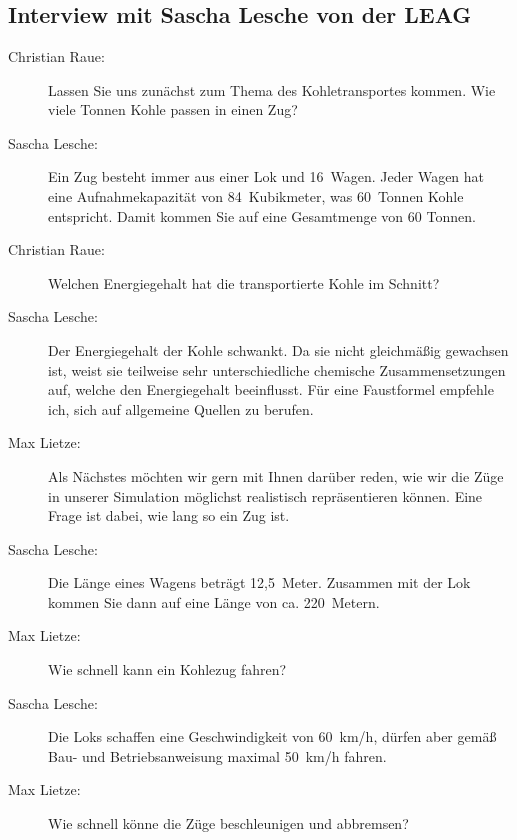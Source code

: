 \chapter{\appendixname}

\section*{Interview mit Sascha Lesche von der LEAG}

\begin{description}

    \item[Christian Raue:] Lassen Sie uns zunächst zum Thema des Kohletransportes kommen. Wie viele Tonnen Kohle passen in einen Zug?

    \item[Sascha Lesche:] Ein Zug besteht immer aus einer Lok und 16~Wagen. Jeder Wagen hat eine Aufnahmekapazität von 84~Kubikmeter, was 60~Tonnen Kohle entspricht. Damit kommen Sie auf eine Gesamtmenge von 60 Tonnen.

    \item[Christian Raue:] Welchen Energiegehalt hat die transportierte Kohle im Schnitt?

    \item[Sascha Lesche:] Der Energiegehalt der Kohle schwankt. Da sie nicht gleichmäßig gewachsen ist, weist sie teilweise sehr unterschiedliche chemische Zusammensetzungen auf, welche den Energiegehalt beeinflusst. Für eine Faustformel empfehle ich, sich auf allgemeine Quellen zu berufen.

    \item[Max Lietze:] Als Nächstes möchten wir gern mit Ihnen darüber reden, wie wir die Züge in unserer Simulation möglichst realistisch repräsentieren können. Eine Frage ist dabei, wie lang so ein Zug ist.

    \item[Sascha Lesche:] Die Länge eines Wagens beträgt 12,5~Meter. Zusammen mit der Lok kommen Sie dann auf eine Länge von ca. 220~Metern.

    \item[Max Lietze:] Wie schnell kann ein Kohlezug fahren?

    \item[Sascha Lesche:] Die Loks schaffen eine Geschwindigkeit von 60~km/h, dürfen aber gemäß Bau- und Betriebsanweisung maximal 50~km/h fahren.

    \item[Max Lietze:] Wie schnell könne die Züge beschleunigen und abbremsen?


\end{description}
